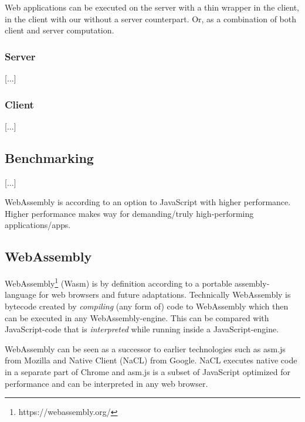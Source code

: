 Web applications can be executed on the server with a thin wrapper in the client, in the client with our without a server counterpart. Or, as a combination of both client and server computation.

\subsubsection{Server}

[...]

\subsubsection{Client}

[...]

\subsection{Benchmarking}

\parencite{LehmannPradel2018,MalleGiulianiKiesebergHolzinger2018}

[...]

WebAssembly is according to \textcite{HaasRossbergSchuffTitzerHolmanGohmanWagnerZakaiBastien2017} an option to JavaScript with higher performance. Higher performance makes way for demanding/truly high-performing applications/apps.

\subsection{WebAssembly}

WebAssembly\footnote{https://webassembly.org/} (Wasm) is by definition according to \textcite{HaasRossbergSchuffTitzerHolmanGohmanWagnerZakaiBastien2017} a portable assembly-language for web browsers and future adaptations. Technically WebAssembly is bytecode created by \emph{compiling} (any form of) code to WebAssembly \parencite{Watt2018} which then can be executed in any WebAssembly-engine. This can be compared with JavaScript-code that is \emph{interpreted} while running inside a JavaScript-engine.

WebAssembly can be seen as a successor to earlier technologies such as asm.js from Mozilla and Native Client (NaCL) from Google. NaCL executes native code in a separate part of Chrome and asm.js  \parencite{Zakai2018} is a subset of JavaScript optimized for performance \parencite{VanEsNicolayStievenartDHondtDeRoover2016} and can be interpreted in any web browser.

